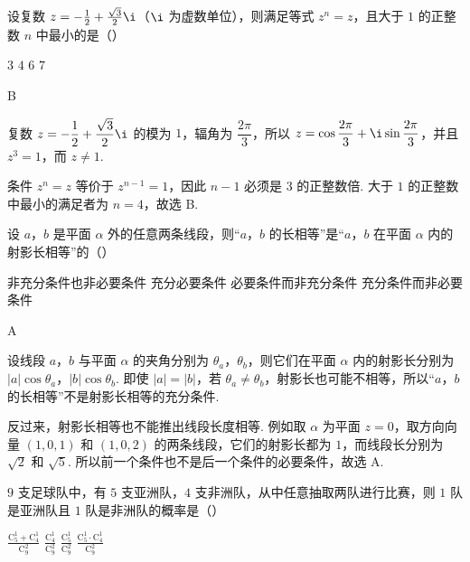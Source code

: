 \documentclass[UTF8,a4paper,oneside,11pt]{ctexbook}
\begin{document}
\begin{problem}
设复数 \(z = -\frac{1}{2} + \frac{\sqrt{3}}{2}\i\)（\(\i\) 为虚数单位），则满足等式 \(z^n = z\)，且大于 \(1\) 的正整数 \(n\) 中最小的是（\quad）

\choices
    {\(3\)}
    {\(4\)}
    {\(6\)}
    {\(7\)}
\end{problem}

\begin{answer}
B
\end{answer}

\begin{solution}
复数 \(z=-\dfrac12+\dfrac{\sqrt3}{2}\i\) 的模为 \(1\)，辐角为 \(\dfrac{2\pi}{3}\)，所以 \(z=\cos\dfrac{2\pi}{3}+\i\sin\dfrac{2\pi}{3}\)，并且 \(z^3=1\)，而 \(z\ne1\).

条件 \(z^n=z\) 等价于 \(z^{n-1}=1\)，因此 \(n-1\) 必须是 \(3\) 的正整数倍. 大于 \(1\) 的正整数中最小的满足者为 \(n=4\)，故选 B.
\end{solution}

\begin{problem}
设 \(a\)，\(b\) 是平面 \(\alpha\) 外的任意两条线段，则“\(a\)，\(b\) 的长相等”是“\(a\)，\(b\) 在平面 \(\alpha\) 内的射影长相等”的（\quad）

\choices
    {非充分条件也非必要条件}
    {充分必要条件}
    {必要条件而非充分条件}
    {充分条件而非必要条件}
\end{problem}

\begin{answer}
A
\end{answer}

\begin{solution}
设线段 \(a\)，\(b\) 与平面 \(\alpha\) 的夹角分别为 \(\theta_a\)，\(\theta_b\)，则它们在平面 \(\alpha\) 内的射影长分别为 \(|a|\cos\theta_a\)，\(|b|\cos\theta_b\). 即使 \(|a|=|b|\)，若 \(\theta_a\ne\theta_b\)，射影长也可能不相等，所以“\(a\)，\(b\) 的长相等”不是射影长相等的充分条件.

反过来，射影长相等也不能推出线段长度相等. 例如取 \(\alpha\) 为平面 \(z=0\)，取方向向量 \((1,0,1)\) 和 \((1,0,2)\) 的两条线段，它们的射影长都为 \(1\)，而线段长分别为 \(\sqrt2\) 和 \(\sqrt5\). 所以前一个条件也不是后一个条件的必要条件，故选 A.
\end{solution}

\begin{problem}
\(9\) 支足球队中，有 \(5\) 支亚洲队，\(4\) 支非洲队，从中任意抽取两队进行比赛，则 \(1\) 队是亚洲队且 \(1\) 队是非洲队的概率是（\quad）

\choices
    {\(\frac{\mathrm C_5^1 + \mathrm C_4^1}{\mathrm C_9^2}\)}
    {\(\frac{\mathrm C_4^1}{\mathrm C_9^2}\)}
    {\(\frac{\mathrm C_5^1}{\mathrm C_9^2}\)}
    {\(\frac{\mathrm C_5^1 \cdot \mathrm C_4^1}{\mathrm C_9^2}\)}
\end{problem}
\end{document}
